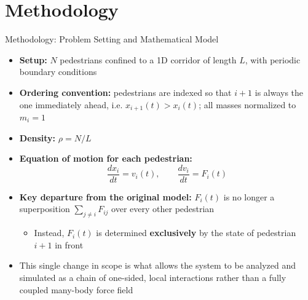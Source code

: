 \documentclass{beamer}
\begin{document}
\section{Methodology}

\begin{frame}{Methodology: Problem Setting and Mathematical Model}
    \begin{itemize}
        \item \textbf{Setup:} $N$ pedestrians confined to a 1D corridor of length $L$, with periodic boundary conditions
        \item \textbf{Ordering convention:} pedestrians are indexed so that $i{+}1$ is always the one immediately ahead, i.e. $x_{i+1}(t) > x_i(t)$; all masses normalized to $m_i = 1$
        \item \textbf{Density:} $\rho = N/L$
        \item \textbf{Equation of motion for each pedestrian:}
        \[
            \frac{dx_i}{dt} = v_i(t), \qquad \frac{dv_i}{dt} = F_i(t)
        \]
        \item \textbf{Key departure from the original model:} $F_i(t)$ is no longer a superposition $\sum_{j\neq i} F_{ij}$ over every other pedestrian
        \begin{itemize}
            \item Instead, $F_i(t)$ is determined \textbf{exclusively} by the state of pedestrian $i+1$ in front
        \end{itemize}
        \item This single change in scope is what allows the system to be analyzed and simulated as a chain of one-sided, local interactions rather than a fully coupled many-body force field
    \end{itemize}
\end{frame}
\end{document}
